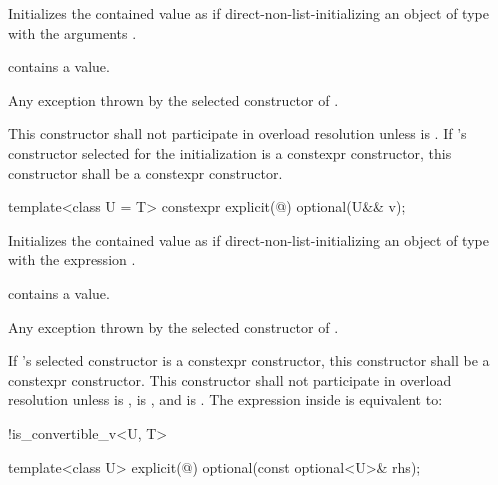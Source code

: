 \begin{itemdescr}
\pnum
\effects
Initializes the contained value as if direct-non-list-initializing an object of type  with the arguments .

\pnum
\ensures
{} contains a value.

\pnum
\throws
Any exception thrown by the selected constructor of .

\pnum
\remarks
This constructor shall not participate in overload resolution unless  is .
If 's constructor selected for the initialization is a constexpr constructor, this constructor shall be a constexpr constructor.
\end{itemdescr}

%
\begin{itemdecl}
template<class U = T> constexpr explicit(@\seebelow@) optional(U&& v);
\end{itemdecl}

\begin{itemdescr}
\pnum
\effects
Initializes the contained value as if direct-non-list-initializing
an object of type  with the expression .

\pnum
\ensures
{} contains a value.

\pnum
\throws
Any exception thrown by the selected constructor of .

\pnum
\remarks
If 's selected constructor is a constexpr constructor,
this constructor shall be a constexpr constructor.
This constructor shall not participate in overload resolution unless
 is ,
 is , and
 is .
The expression inside  is equivalent to:
\begin{codeblock}
!is_convertible_v<U, T>
\end{codeblock}
\end{itemdescr}

%
\begin{itemdecl}
template<class U> explicit(@\seebelow@) optional(const optional<U>& rhs);
\end{itemdecl}

